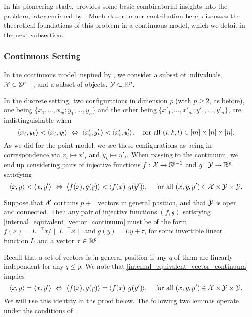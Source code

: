 \documentclass[twoside, 11pt]{article}
\begin{document}
In his pioneering study, \citet{bennett1956determination} provides some basic combinatorial insights into the problem, later enriched by \citet{davidson1973geometrical}.
Much closer to our contribution here, 
\citet{shepard1966metric} discusses the theoretical foundations of this problem in a continuous model, which we detail in the next subsection.


\subsubsection{Continuous Setting}
\label{sec:internal vector continuum}

In the continuous model inspired by \citet{shepard1966metric}, we consider a subset of individuals, $\mathcal{X} \subset \mathbb{S}^{p-1}$, and a subset of objects, $\mathcal{Y} \subset \mathbb{R}^p$.  

In the discrete setting, two configurations in dimension $p$ (with $p \ge 2$, as before), one being $\{x_1, \dots, x_m; y_1, \dots, y_n\}$ and the other being $\{x'_1, \dots, x'_m; y'_1, \dots, y'_n\}$, are indistinguishable when
\begin{equation}
\label{internal_equivalent_vector_discrete}
\text{$\langle x_i, y_k\rangle < \langle x_i, y_l\rangle \ \Leftrightarrow \  \langle x'_i,y'_k\rangle < \langle x'_i,y'_l\rangle$, \quad for all $(i,k,l) \in [m] \times [n] \times [n]$.}
\end{equation}
As we did for the point model, we see these configurations as being in correspondence via $x_i \mapsto x'_i$ and $y_k \mapsto y'_k$. 
When passing to the continuum, we end up considering pairs of injective functions $f : \mathcal{X} \to \mathbb{S}^{p-1}$ and $g: \mathcal{Y} \to \mathbb{R}^p$ satisfying 
\begin{equation}
\label{internal_equivalent_vector_continuum}
\text{$\langle x,y\rangle < \langle x,y'\rangle \ \Leftrightarrow \  \langle f(x),g(y)\rangle < \langle f(x),g(y')\rangle$, \quad for all $(x, y, y') \in \mathcal{X} \times \mathcal{Y} \times \mathcal{Y}$.}
\end{equation}

\begin{theorem}
\label{thm:internal_vector}
Suppose that $\mathcal{X}$ contains $p+1$ vectors in general position, and that $\mathcal{Y}$ is open and connected. Then any pair of injective functions $(f,g)$ satisfying \eqref{internal_equivalent_vector_continuum} must be of the form $f(x) = L^{-\top} x/\|L^{-\top} x\|$ and $g(y) = Ly + \tau$, for some invertible linear function $L$ and a vector $\tau \in \mathbb{R}^p$. 
\end{theorem}

Recall that a set of vectors is in general position if any $q$ of them are linearly independent for any $q \le p$. 
We note that \eqref{internal_equivalent_vector_continuum} implies
\begin{equation}
\label{internal_equivalent_vector_continuum_equal}
\text{$\langle x,y\rangle = \langle x,y'\rangle \ \Leftrightarrow \  \langle f(x),g(y)\rangle = \langle f(x),g(y')\rangle$, \quad for all $(x, y, y') \in \mathcal{X} \times \mathcal{Y} \times \mathcal{Y}$.}
\end{equation}
We will use this identity in the proof below.
The following two lemmas operate under the conditions of .
\end{document}
